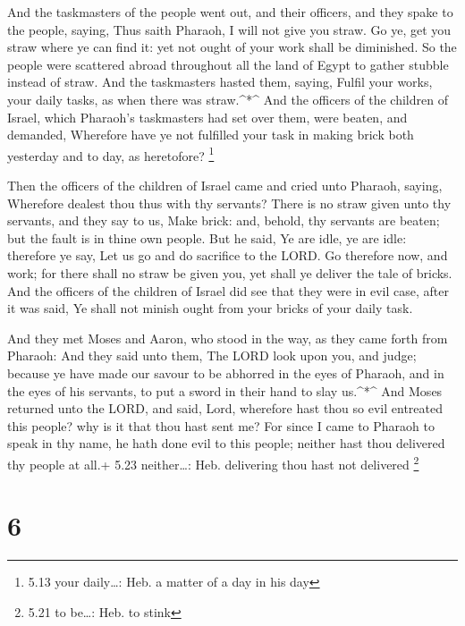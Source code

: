  And the taskmasters of the people went out, and their
officers, and they spake to the people, saying, Thus saith Pharaoh, I
will not give you straw.  Go ye, get you straw where ye can
find it: yet not ought of your work shall be diminished. 
So the people were scattered abroad throughout all the land of Egypt to
gather stubble instead of straw.  And the taskmasters
hasted them, saying, Fulfil your works, your daily tasks, as when there
was straw.\^{}*\^{}  And the officers of the children of
Israel, which Pharaoh's taskmasters had set over them, were beaten, and
demanded, Wherefore have ye not fulfilled your task in making brick both
yesterday and to day, as heretofore? \footnote{5.13 your daily\ldots:
  Heb. a matter of a day in his day}

 Then the officers of the children of Israel came and cried
unto Pharaoh, saying, Wherefore dealest thou thus with thy servants?
 There is no straw given unto thy servants, and they say to
us, Make brick: and, behold, thy servants are beaten; but the fault is
in thine own people.  But he said, Ye are idle, ye are
idle: therefore ye say, Let us go and do sacrifice to the LORD.
 Go therefore now, and work; for there shall no straw be
given you, yet shall ye deliver the tale of bricks.  And
the officers of the children of Israel did see that they were in evil
case, after it was said, Ye shall not minish ought from your bricks of
your daily task.

 And they met Moses and Aaron, who stood in the way, as
they came forth from Pharaoh:  And they said unto them, The
LORD look upon you, and judge; because ye have made our savour to be
abhorred in the eyes of Pharaoh, and in the eyes of his servants, to put
a sword in their hand to slay us.\^{}*\^{}  And Moses
returned unto the LORD, and said, Lord, wherefore hast thou so evil
entreated this people? why is it that thou hast sent me? 
For since I came to Pharaoh to speak in thy name, he hath done evil to
this people; neither hast thou delivered thy people at all.+ 5.23
neither\ldots: Heb. delivering thou hast not delivered \footnote{5.21 to
  be\ldots: Heb. to stink}

\hypertarget{section-5}{%
\section{6}\label{section-5}}

